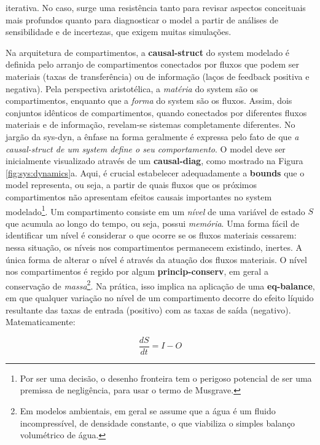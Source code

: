 \documentclass[./main.tex]{subfiles}
\begin{document}
iterativa. No caso, surge uma resistência tanto para revisar aspectos conceituais mais profundos quanto para diagnosticar o \gls{model} a partir de análises de sensibilidade e de incertezas, que exigem muitas simulações.

\par Na arquitetura de compartimentos, a \textbf{\gls{causal-struct}} do \gls{system} modelado é definida pelo arranjo de compartimentos conectados por fluxos que podem ser materiais (taxas de transferência) ou de informação (laços de \gls{feedback} positiva e negativa). Pela perspectiva aristotélica, a \textit{matéria} do \gls{system} são os compartimentos, enquanto que a \textit{forma} do \gls{system} são os fluxos. Assim, dois conjuntos idênticos de compartimentos, quando conectados por diferentes fluxos materiais e de informação, revelam-se sistemas completamente diferentes. No jargão da \gls{sys-dyn}, a ênfase na forma geralmente é expressa pelo fato de que \textit{a \gls{causal-struct} de um \gls{system} define o seu comportamento}. O \gls{model} deve ser inicialmente visualizado através de um \textbf{\gls{causal-diag}}, como mostrado na Figura \ref{fig:sys:dynamics}a. Aqui, é crucial estabelecer adequadamente a \textbf{\gls{bounds}} que o \gls{model} representa, ou seja, a partir de quais fluxos que os próximos compartimentos não apresentam efeitos causais importantes no \gls{system} modelado\footnote{Por ser uma decisão, o desenho fronteira tem o perigoso potencial de ser uma premissa de negligência, para usar o termo de Musgrave.}. Um compartimento consiste em um \textit{nível} de uma variável de estado $S$ que acumula ao longo do tempo, ou seja, possui \textit{memória}. Uma forma fácil de identificar um nível é considerar o que ocorre se os fluxos materiais cessarem: nessa situação, os níveis nos compartimentos permanecem existindo, inertes. A única forma de alterar o nível é através da atuação dos fluxos materiais. O nível nos compartimentos é regido por algum \textbf{\gls{princip-conserv}}, em geral a conservação de \textit{massa}\footnote{Em modelos ambientais, em geral se assume que a água é um fluido incompressível, de densidade constante, o que viabiliza o simples balanço volumétrico de água.}. Na prática, isso implica na aplicação de uma \textbf{\gls{eq-balance}}, em que qualquer variação no nível de um compartimento decorre do efeito líquido resultante das taxas de entrada (positivo) com as taxas de saída (negativo). Matematicamente:
\begin{linenomath*}
\begin{equation}
\label{eq:balance}
\frac{dS}{dt} = I - O 
\end{equation}
\end{linenomath*}
\end{document}
